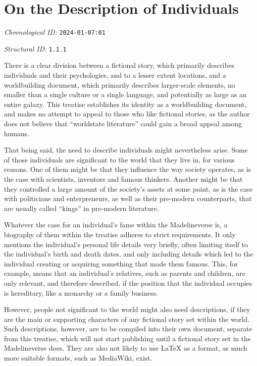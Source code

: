 \section{On the Description of Individuals}
\emph{Chronological ID:} \texttt{2024-01-07:01}

\emph{Structural ID:} \texttt{1.1.1}

There is a clear division between a fictional story, which primarily describes individuals and their psychologies, and to a lesser extent locations, and a worldbuilding document, which primarily describes larger-scale elements, no smaller than a single culture or a single language, and potentially as large as an entire galaxy. This treatise establishes its identity as a worldbuilding document, and makes no attempt to appeal to those who like fictional stories, as the author does not believe that ``worldstate literature'' could gain a broad appeal among humans.

That being said, the need to describe individuals might nevertheless arise. Some of those individuals are significant to the world that they live in, for various reasons. One of them might be that they influence the way society operates, as is the case with scientists, inventors and famous thinkers. Another might be that they controlled a large amount of the society's assets at some point, as is the case with politicians and enterpreneurs, as well as their pre-modern counterparts, that are usually called ``kings'' in pre-modern literature.

Whatever the case for an individual's fame within the Madelineverse is, a biography of them within the treatise adheres to strict requirements. It only mentions the individual's personal life details very briefly, often limiting itself to the individual's birth and death dates, and only including details which led to the individual creating or acquiring something that made them famous. This, for example, means that an individual's relatives, such as parents and children, are only relevant, and therefore described, if the position that the individual occupies is hereditary, like a monarchy or a family business.

However, people not significant to the world might also need descriptions, if they are the main or supporting characters of any fictional story set within the world. Such descriptions, however, are to be compiled into their own document, separate from this treatise, which will not start publishing until a fictional story set in the Madelineverse does. They are also not likely to use {\LaTeX} as a format, as much more suitable formats, such as MediaWiki, exist.
\newpage
